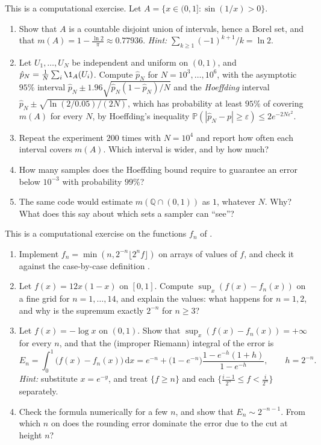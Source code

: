 \begin{exercise}\label{ex:mf-monte-carlo}
\medium This is a computational exercise. Let $A=\{x\in(0,1]:\sin(1/x)>0\}$.
\begin{enumerate}[label=(\alph*)]
  \item Show that $A$ is a countable disjoint union of intervals, hence a Borel set, and that
    $m(A)=1-\frac{\ln2}{\pi}\approx0.77936$. \emph{Hint:} $\sum_{k\ge1}(-1)^{k+1}/k=\ln2$.
  \item Let $U_1,\dots,U_N$ be independent and uniform on $(0,1)$, and
    $\hat p_N=\frac1N\sum_i\1_A(U_i)$. Compute $\hat p_N$ for $N=10^3,\dots,10^6$, with the
    asymptotic $95\%$ interval $\hat p_N\pm1.96\sqrt{\hat p_N(1-\hat p_N)/N}$ and the
    \emph{Hoeffding} interval $\hat p_N\pm\sqrt{\ln(2/0.05)/(2N)}$, which has probability at
    least $95\%$ of covering $m(A)$ for every $N$, by Hoeffding's inequality
    $\mathbb P(|\hat p_N-p|\ge\varepsilon)\le2e^{-2N\varepsilon^2}$.
  \item Repeat the experiment $200$ times with $N=10^4$ and report how often each interval
    covers $m(A)$. Which interval is wider, and by how much?
  \item How many samples does the Hoeffding bound require to guarantee an error below
    $10^{-3}$ with probability $99\%$?
  \item The same code would estimate $m(\mathbb Q\cap(0,1))$ as $1$, whatever $N$. Why? What does
    this say about which sets a sampler can ``see''?
\end{enumerate}
\end{exercise}

\begin{exercise}\label{ex:mf-dyadic-rate}
\medium This is a computational exercise on the functions $f_n$ of .
\begin{enumerate}[label=(\alph*)]
  \item Implement $f_n=\min(n,2^{-n}\lfloor2^nf\rfloor)$ on arrays of values of $f$, and check
    it against the case-by-case definition .
  \item Let $f(x)=12x(1-x)$ on $[0,1]$. Compute $\sup_x(f(x)-f_n(x))$ on a fine grid for
    $n=1,\dots,14$, and explain the values: what happens for $n=1,2$, and why is the supremum
    exactly $2^{-n}$ for $n\ge3$?
  \item Let $f(x)=-\log x$ on $(0,1)$. Show that $\sup_x(f(x)-f_n(x))=+\infty$ for every $n$, and
    that the (improper Riemann) integral of the error is
    \[
      E_n=\int_0^1\big(f(x)-f_n(x)\big)\,\mathrm dx
      =e^{-n}+\big(1-e^{-n}\big)\frac{1-e^{-h}(1+h)}{1-e^{-h}},\qquad h=2^{-n}.
    \]
    \emph{Hint:} substitute $x=e^{-y}$, and treat $\{f\ge n\}$ and each
    $\{\frac{i-1}{2^n}\le f<\frac{i}{2^n}\}$ separately.
  \item Check the formula numerically for a few $n$, and show that $E_n\sim2^{-n-1}$. From
    which $n$ on does the rounding error dominate the error due to the cut at height $n$?
\end{enumerate}
\end{exercise}
